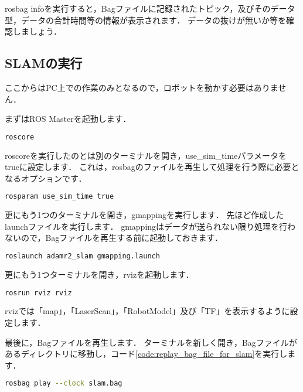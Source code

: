 \documentclass[{../../master}]{subfiles}
\begin{document}
\textsf{rosbag info}を実行すると，Bagファイルに記録されたトピック，及びそのデータ型，データの合計時間等の情報が表示されます．
データの抜けが無いか等を確認しましょう．

\subsection{SLAMの実行}

ここからはPC上での作業のみとなるので，ロボットを動かす必要はありません．

まずはROS Masterを起動します．

\begin{lstlisting}[language=sh, caption=Execute \textsf{roscore}]
roscore
\end{lstlisting}

\textsf{roscore}を実行したのとは別のターミナルを開き，\textsf{use\_sim\_time}パラメータをtrueに設定します．
これは，\textsf{rosbag}のファイルを再生して処理を行う際に必要となるオプションです．

\begin{lstlisting}[language=sh, caption=Set \textsf{use\_sim\_time} to true]
rosparam use_sim_time true
\end{lstlisting}

更にもう1つのターミナルを開き，\textsf{gmapping}を実行します．
先ほど作成したlaunchファイルを実行します．
\textsf{gmapping}はデータが送られない限り処理を行わないので，Bagファイルを再生する前に起動しておきます．

\begin{lstlisting}[language=sh, caption=Run \textsf{gmapping.launch}]
roslaunch adamr2_slam gmapping.launch
\end{lstlisting}

更にもう1つターミナルを開き，\textsf{rviz}を起動します．

\begin{lstlisting}[language=sh, caption=Run \textsf{rviz}]
rosrun rviz rviz
\end{lstlisting}

\textsf{rviz}では「map」，「LaserScan」，「RobotModel」及び「TF」を表示するように設定します．

最後に，Bagファイルを再生します．
ターミナルを新しく開き，Bagファイルがあるディレクトリに移動し，コード\ref{code:replay_bag_file_for_slam}を実行します．

\begin{lstlisting}[language=sh, label=code:replay_bag_file_for_slam, caption=Replay \textsf{slam.bag}]
rosbag play --clock slam.bag
\end{lstlisting}
\end{document}
